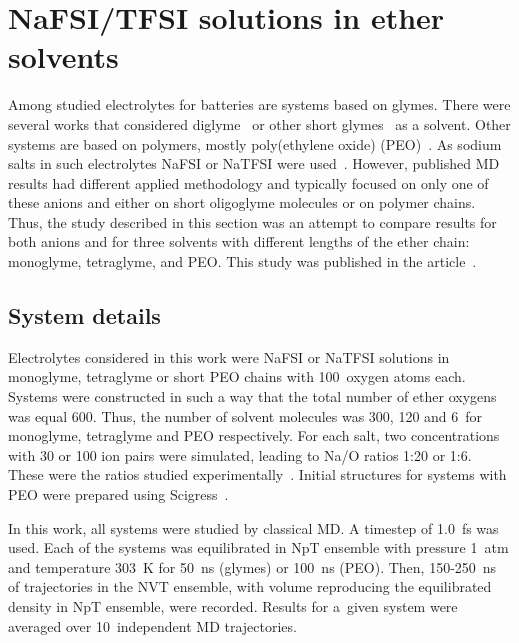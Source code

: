 \section{NaFSI/TFSI solutions in ether solvents}

Among studied electrolytes for batteries are systems based on glymes. There were several works that considered diglyme~\cite{peo-diglyme-1,peo-diglyme-2,peo-diglyme-3} or other short glymes~\cite{na-dft-12,na-dft-14,na-interactions-1,na-dft-16,spectroscopy-structure-1,peo-na-glyme-1,peo-na-glyme-2,peo-na-glyme-3} as a solvent. Other systems are based on polymers, mostly poly(ethylene oxide) (PEO)~\cite{el-peo-2,ir-interactions-9,peo-na-tfsi-peo-1}. As sodium salts in such electrolytes NaFSI or NaTFSI were used~\cite{na-dft-12,na-dft-14,na-dft-16,peo-na-glyme-1,el-peo-2,ir-interactions-9,peo-na-tfsi-peo-1}. However, published MD results had different applied methodology and typically focused on only one of these anions and either on short oligoglyme molecules or on polymer chains. Thus, the study described in this section was an attempt to compare results for both anions and for three solvents with different lengths of the ether chain: monoglyme, tetraglyme, and PEO. This study was published in the article~\cite{peo-na}.

\subsection{System details}

Electrolytes considered in this work were NaFSI or NaTFSI solutions in monoglyme, tetraglyme or short PEO chains with 100~oxygen atoms each. Systems were constructed in such a way that the total number of ether oxygens was equal 600. Thus, the number of solvent molecules was 300, 120 and 6~for monoglyme, tetraglyme and PEO respectively. For each salt, two concentrations with 30 or 100 ion pairs were simulated, leading to Na/O ratios 1:20 or 1:6. These were the ratios studied experimentally~\cite{ir-interactions-9}. Initial structures for systems with PEO were prepared using Scigress~\cite{scigress}.

In this work, all systems were studied by classical MD. A timestep of 1.0~fs was used. Each of the systems was equilibrated in NpT ensemble with pressure 1~atm and temperature 303~K for 50~ns (glymes) or 100~ns (PEO). Then, 150-250~ns of trajectories in the NVT ensemble, with volume reproducing the equilibrated density in NpT ensemble, were recorded. Results for a~given system were averaged over 10~independent MD trajectories.

